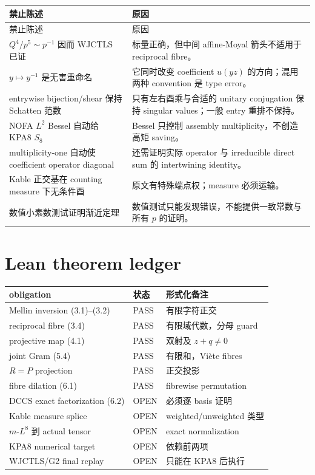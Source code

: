 \documentclass[11pt,a4paper]{ctexart}
\theoremstyle{definition}
\newcommand{\OPEN}{\textcolor{red!70!black}{\textsf{OPEN}}}
\newcommand{\PASS}{\textcolor{green!45!black}{\textsf{PASS}}}
\begin{document}
\begin{longtable}{p{}p{}}
\toprule
禁止陈述 & 原因\\
\midrule
\endfirsthead
\toprule
禁止陈述 & 原因\\
\midrule
\endhead
$Q^4/p^5\sim p^{-1}$ 因而 WJCTLS 已证
& 标量正确，但中间 affine-Moyal 箭头不适用于 reciprocal fibre。\\
$y\mapsto y^{-1}$ 是无害重命名
& 它同时改变 coefficient $u(yz)$ 的方向；混用两种 convention 是 type error。\\
entrywise bijection/shear 保持 Schatten 范数
& 只有左右酉乘与合适的 unitary conjugation 保持 singular values；一般 entry
重排不保持。\\
NOFA $L^2$ Bessel 自动给 KPA8 $S_8$
& Bessel 只控制 assembly multiplicity，不创造高矩 saving。\\
multiplicity-one 自动使 coefficient operator diagonal
& 还需证明实际 operator 与 irreducible direct sum 的 intertwining identity。\\
Kable 正交基在 counting measure 下无条件酉
& 原文有特殊端点权；measure 必须运输。\\
数值小素数测试证明渐近定理
& 数值测试只能发现错误，不能提供一致常数与所有 $p$ 的证明。\\
\bottomrule
\end{longtable}

\section{Lean theorem ledger}

\begin{center}
\begin{tabular}{p{}p{}p{}}
\toprule
obligation & 状态 & 形式化备注\\
\midrule
Mellin inversion (3.1)--(3.2) & \PASS & 有限字符正交\\
reciprocal fibre (3.4) & \PASS & 有限域代数，分母 guard\\
projective map (4.1) & \PASS & 双射及 $z+q\ne0$\\
joint Gram (5.4) & \PASS & 有限和，Vi\`ete fibres\\
$R=P$ projection & \PASS & 正交投影\\
fibre dilation (6.1) & \PASS & fibrewise permutation\\
DCCS exact factorization (6.2) & \OPEN & 必须逐 basis 证明\\
Kable measure splice & \OPEN & weighted/unweighted 类型\\
$m$-$L^8$ 到 actual tensor & \OPEN & exact normalization\\
KPA8 numerical target & \OPEN & 依赖前两项\\
WJCTLS/G2 final replay & \OPEN & 只能在 KPA8 后执行\\
\bottomrule
\end{tabular}
\end{center}
\end{document}
